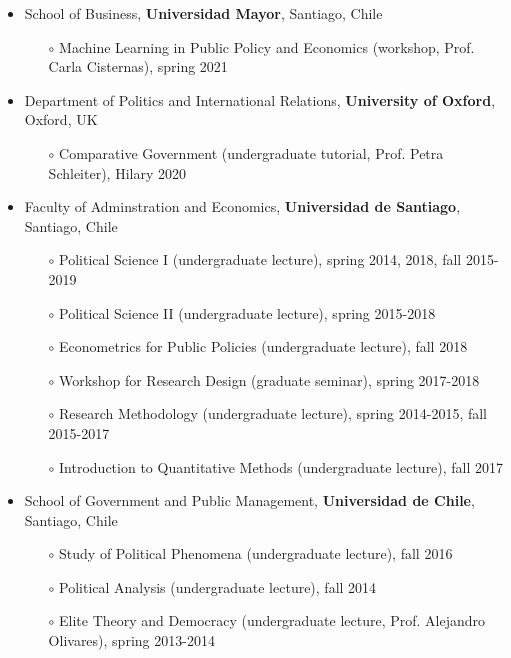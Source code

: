 \begin{publications}

\begin{itemize}
\item{\small School of Business, {\bfseries Universidad Mayor}, Santiago, Chile}
\begin{itemize}
\item[$\circ$]{\small Machine Learning in Public Policy and Economics (workshop, Prof. Carla Cisternas), spring 2021}
\end{itemize}
\item{\small Department of Politics and International Relations, {\bfseries University of Oxford}, Oxford, UK}
\begin{itemize}
\item[$\circ$]{\small Comparative Government (undergraduate tutorial, Prof. Petra Schleiter), Hilary 2020}
\end{itemize}
\item{\small Faculty of Adminstration and Economics, {\bfseries Universidad de Santiago}, Santiago, Chile}
\begin{itemize}
\item[$\circ$]{\small Political Science I (undergraduate lecture), spring 2014, 2018, fall 2015-2019}
\item[$\circ$]{\small Political Science II (undergraduate lecture), spring 2015-2018}
\item[$\circ$]{\small Econometrics for Public Policies (undergraduate lecture), fall 2018}
\item[$\circ$]{\small Workshop for Research Design (graduate seminar), spring 2017-2018}
\item[$\circ$]{\small Research Methodology (undergraduate lecture), spring 2014-2015, fall 2015-2017}
\item[$\circ$]{\small Introduction to Quantitative Methods (undergraduate lecture), fall 2017}
\end{itemize}
\item{\small School of Government and Public Management, {\bfseries Universidad de Chile}, Santiago, Chile}
\begin{itemize}
\item[$\circ$]{\small Study of Political Phenomena (undergraduate lecture), fall 2016}
\item[$\circ$]{\small Political Analysis (undergraduate lecture), fall 2014}
\item[$\circ$]{\small Elite Theory and Democracy (undergraduate lecture, Prof. Alejandro Olivares), spring 2013-2014}
\end{itemize}
\end{itemize}

\vspace{1mm}
\end{publications}

